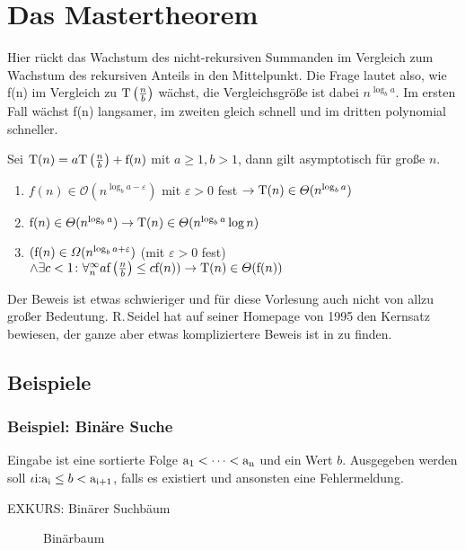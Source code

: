 \documentclass[ngerman,draft,parskip=half*,twoside]{scrreprt}
\theoremstyle{break}
\theoremstyle{nonumberbreak}
\newcommand*{\OO}{\mathcal{O}}      %
\begin{document}
\section{Das Mastertheorem}
Hier rückt das Wachstum des nicht-rekursiven Summanden im Vergleich zum Wachstum des rekursiven Anteils in den Mittelpunkt. Die Frage
lautet also, wie f(n) im Vergleich zu $\textup{T}\left(\frac{n}{b}\right)$ wächst, die Vergleichsgröße ist dabei $n^{\log_ba}$.
Im ersten Fall wächst f(n) langsamer, im zweiten gleich schnell und im dritten polynomial schneller.

Sei $\textup{T}(n)=a \textup{T}\left(\frac{n}{b}\right)+\textup{f}(n)$ mit $ a \geq 1,b > 1$, 
dann gilt asymptotisch für große $n$.

\begin{enumerate}
\item $f(n) \in \OO(n^{\log_b a-\varepsilon})$ mit $\varepsilon > 0$ fest $\rightarrow \textup{T}(n) \in\Theta(n^{\log_ba})$

\item $\textup{f}(n) \in\Theta(n^{\log_ba}) \rightarrow \textup{T}(n) \in\Theta(n^{\log_ba} \log n)$

\item $(\textup{f}(n) \in\Omega(n^{\log_ba+\varepsilon} ) $ (mit $ \varepsilon > 0 $ fest)
$\wedge\exists c < 1 \colon  \forall^{\infty}_{n}
a \textup{f}\left(\frac{n}{b}\right)  \leq c \textup{f}(n)) \rightarrow \textup{T}(n) \in \Theta(\textup{f}(n))$
\end{enumerate}

Der Beweis ist etwas schwieriger und für diese Vorlesung auch nicht
von allzu großer Bedeutung.
R.\,Seidel hat auf seiner Homepage
von 1995 den Kernsatz bewiesen, der ganze aber etwas kompliziertere Beweis ist in \cite{cormen} zu finden. 

\subsection{Beispiele}
\subsubsection{Beispiel: Binäre Suche} 

Eingabe ist eine sortierte Folge $\textup{a}_1 < \dots < \textup{a}_{\textup{n}}$ und ein Wert $b$. Ausgegeben werden soll
$\iota \textup{i:a}_{\textup{i}} \leq b < \textup{a}_{\textup{i+1}}$, falls es existiert und ansonsten eine Fehlermeldung.


EXKURS: Binärer Suchbäum
\begin{figure}[H]
	\centering
	\caption{Binärbaum}
	\label{271003a}
\end{figure}
\end{document}
